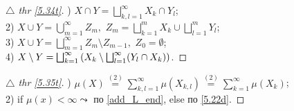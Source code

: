 
\begin{minipage}[t]{0.45\textwidth}
\begin{proof}[
{$\triangle$} 
thr \eqref{5.34t}]

\phantom{42}

) $X \cap Y = \bigsqcup_{k,l=1}^\infty X_k \cap Y_l$;\\
2) $X \cup Y = \bigcup_{m=1}^\infty Z_m, \,\, Z_m = \bigsqcup_{k=1}^m X_k \cup \bigsqcup_{l=1}^m Y_l$;\\
3) $X\cup Y = \bigsqcup_{m=1}^\infty Z_m \setminus Z_{m-1}, \,\, Z_0 = \emptyset$;\\
4) $X \setminus Y = \bigsqcup_{k=1}^\infty \left(X_k \setminus \bigsqcup_{l=1}^\infty (Y_l \cap X_k)\right)$.
\end{proof}
\end{minipage}  
\hfill
\begin{minipage}[t]{0.45\textwidth}
\begin{proof}[
{$\triangle$} 
thr \eqref{5.35t}]

\phantom{42}

) $\mu(X) \overset{(2)}{=} \sum\limits_{ k,l=1 }^{ \infty } \mu(X_{k,l}) \overset{(2)}{=} \sum\limits_{ k=1 }^{ \infty } \mu (X_k)$;\\
2) if $\mu(x) < \infty \leadsto$ по \ref{add_L_end}, else по \ref{5.22d}.
\end{proof}
\end{minipage}  